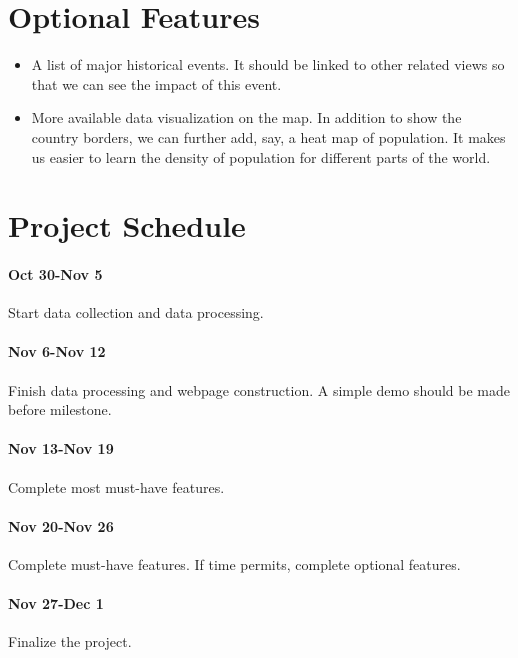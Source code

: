 \documentclass[12pt, fullpage,letterpaper]{article}
\begin{document}
\section{Optional Features}
\begin{itemize}
    \item A list of major historical events. It should be linked to other related views so that we can see the impact of this event.
    \item More available data visualization on the map. In addition to show the country borders, we can further add, say, a heat map of population. It makes us easier to learn the density of population for different parts of the world.
\end{itemize}
\section{Project Schedule}
\paragraph{Oct 30-Nov 5} Start data collection and data processing.
\paragraph{Nov 6-Nov 12} Finish data processing and webpage construction. A simple demo should be made before milestone.
\paragraph{Nov 13-Nov 19} Complete most must-have features.
\paragraph{Nov 20-Nov 26} Complete must-have features. If time permits, complete optional features.
\paragraph{Nov 27-Dec 1} Finalize the project.
\end{document}
